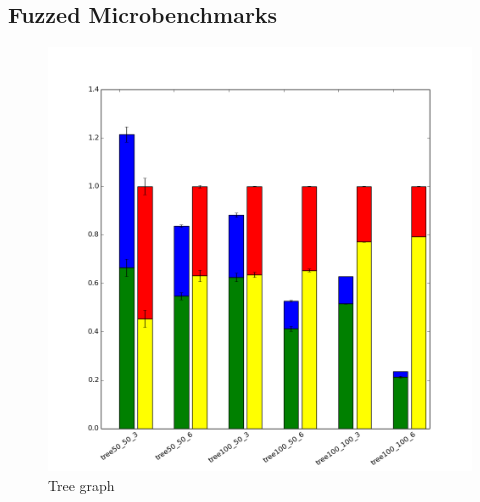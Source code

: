\subsection{Fuzzed Microbenchmarks}

\begin{figure}
    \includegraphics[width=0.9\columnwidth]{figures/graphs/TreeGraph.png}
    \caption{Tree graph}
\end{figure}